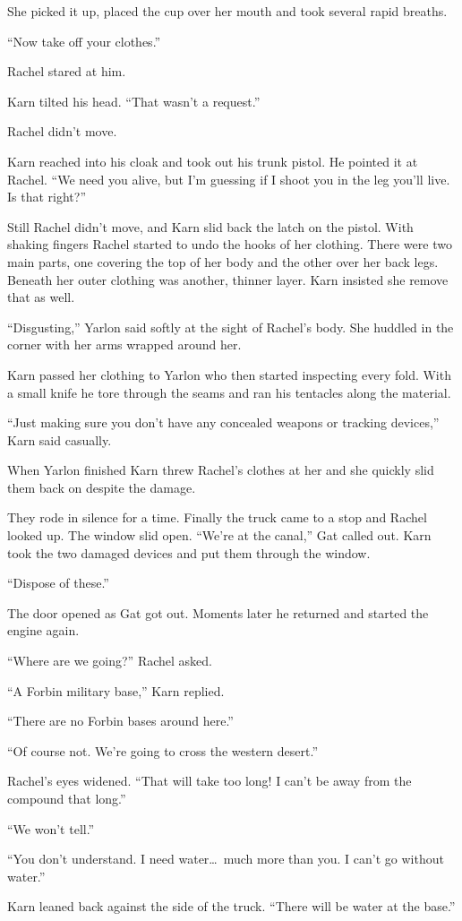 She picked it up, placed the cup over her mouth and took several rapid breaths.

``Now take off your clothes.''

Rachel stared at him.

Karn tilted his head. ``That wasn't a request.''

Rachel didn't move.

Karn reached into his cloak and took out his trunk pistol. He pointed it at Rachel. ``We need
you alive, but I'm guessing if I shoot you in the leg you'll live. Is that right?''

Still Rachel didn't move, and Karn slid back the latch on the pistol. With shaking fingers
Rachel started to undo the hooks of her clothing. There were two main parts, one covering the
top of her body and the other over her back legs. Beneath her outer clothing was another,
thinner layer. Karn insisted she remove that as well.

``Disgusting,'' Yarlon said softly at the sight of Rachel's body. She huddled in the corner with
her arms wrapped around her.

Karn passed her clothing to Yarlon who then started inspecting every fold. With a small knife he
tore through the seams and ran his tentacles along the material.

``Just making sure you don't have any concealed weapons or tracking devices,'' Karn said
casually.

When Yarlon finished Karn threw Rachel's clothes at her and she quickly slid them back on
despite the damage.

They rode in silence for a time. Finally the truck came to a stop and Rachel looked up. The
window slid open. ``We're at the canal,'' Gat called out. Karn took the two damaged devices and
put them through the window.

``Dispose of these.''

The door opened as Gat got out. Moments later he returned and started the engine again.

``Where are we going?'' Rachel asked.

``A Forbin military base,'' Karn replied.

``There are no Forbin bases around here.''

``Of course not. We're going to cross the western desert.''

Rachel's eyes widened. ``That will take too long! I can't be away from the compound that
long.''

``We won't tell.''

``You don't understand. I need water\ldots\ much more than you. I can't go without water.''

Karn leaned back against the side of the truck. ``There will be water at the base.''
